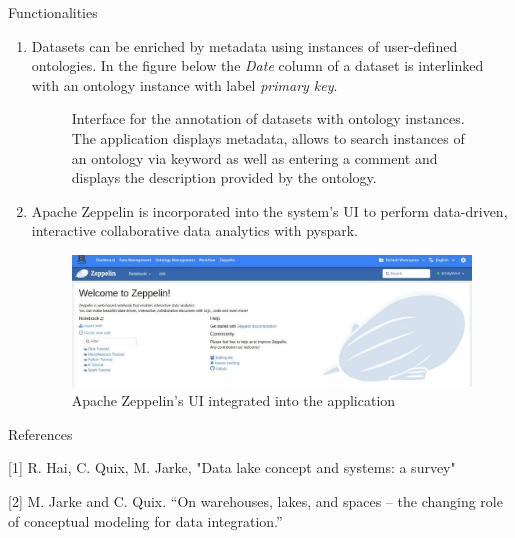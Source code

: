 \documentclass[12pt]{beamer}
\begin{document}
\begin{textblock}{0.5}
\begin{block}{Functionalities}
\begin{enumerate}
				\item Datasets can be enriched by metadata using instances of user-defined ontologies. In the figure below the \textit{Date} column of a dataset is interlinked with an ontology instance with label \textit{primary key}.
				\begin{figure}[H]
					\caption{Interface for the annotation of datasets with ontology instances. The application displays metadata, allows to search instances of an ontology via keyword as well as entering a comment and displays the description provided by the ontology.}
				\end{figure}   
				
				\item Apache Zeppelin is incorporated into the system's UI to perform data-driven,
				interactive collaborative data analytics with pyspark.
				
				\begin{figure}[H]
					\includegraphics[width=0.93\linewidth]{zeppelin.jpeg}
					\caption{Apache Zeppelin's UI integrated into the application}
				\end{figure} 
			\end{enumerate}
			
		\end{block}
		
		\begin{block}{References}
			\item{[1] R. Hai, C. Quix, M. Jarke, "Data lake concept and systems: a survey"}
			\item{[2] M. Jarke and C. Quix. “On warehouses, lakes, and spaces – the changing role of conceptual modeling for data integration.”}
		\end{block}
		
	\end{textblock}
	
\end{document}

